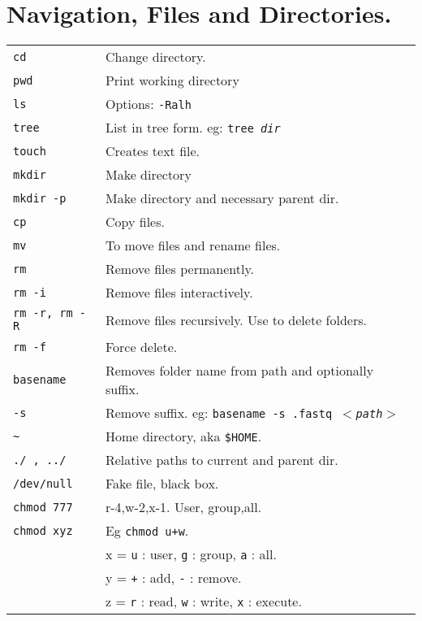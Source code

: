 \section{Navigation, Files and Directories.}

\begin{tabularx}{\linewidth}{lX}
    \texttt{cd} & Change directory.\\
    \texttt{pwd} & Print working directory\\
    \texttt{ls} & Options: \texttt{-Ralh} \\
    \texttt{tree} & List in tree form. eg: \texttt{tree \textit{dir}}\\
    \hline

    \texttt{touch} & Creates text file. \\
    \texttt{mkdir} & Make directory\\
    \texttt{mkdir -p} & Make directory and necessary parent dir.\\
    \texttt{cp} & Copy files.\\
    \texttt{mv} & To move files and rename files.\\
    \texttt{rm} & Remove files permanently. \\
    \texttt{rm -i} & Remove files interactively. \\
    \texttt{rm -r, rm -R} & Remove files recursively. Use to delete folders.\\
    \texttt{rm -f} & Force delete.\\
    \texttt{basename} & Removes folder name from path and optionally  suffix.\\
    \texttt{-s} & Remove suffix. eg: \texttt{basename -s .fastq $<$\textit{path}$>$}\\
    \hline

    \texttt{\~} & Home directory, aka \texttt{\$HOME}.\\
    \texttt{./ , ../} & Relative paths to current and parent dir.\\
    \texttt{/dev/null} & Fake file, black box.\\ 
    \hline

    \texttt{chmod 777} & r-4,w-2,x-1. User, group,all.  \\
    \texttt{chmod xyz} & Eg \texttt{chmod u+w}.\\
    & x = \texttt{u} : user, \texttt{g} : group, \texttt{a} : all.\\
    & y = \texttt{+} : add, \texttt{-} : remove.\\
    & z = \texttt{r} : read, \texttt{w} : write, \texttt{x} : execute.\\
    \hline


\end{tabularx}

